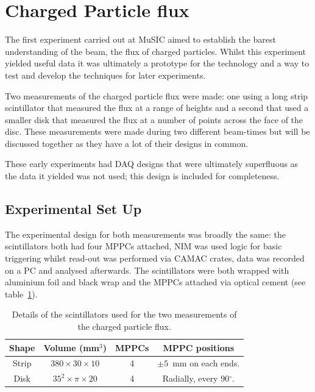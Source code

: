 \section{Charged Particle flux} %
\label{cha:charged_particle_flux}
The first experiment carried out at MuSIC aimed to establish the barest understanding of the beam, the flux of charged particles. Whilst this experiment yielded useful data it was ultimately a prototype for the technology and a way to test and develop the techniques for later experiments.

Two measurements of the charged particle flux were made: one using a long strip scintillator that measured the flux at a range of heights and a second that used a smaller disk that measured the flux at a number of points across the face of the disc. These measurements were made during two different beam-times but will be discussed together as they have a lot of their designs in common.

These early experiments had DAQ designs that were ultimately superfluous as the data it yielded was not used; this design is included for completeness.
\subsection{Experimental Set Up} %
\label{sec:experimental_set_up}
The experimental design for both measurements was broadly the same: the scintillators both had four MPPCs attached, NIM was used logic for basic triggering whilst read-out was performed via CAMAC crates, data was recorded on a PC and analysed afterwards. The scintillators were both wrapped with aluminium foil and black wrap and the MPPCs attached via optical cement (see table~\ref{tab:charged_particle_flux_scint_details}).
\begin{table}
  \begin{center}
    \begin{tabular}{c|c|c|c}
      Shape  &  Volume (mm\(^3\))            &  MPPCs  &  MPPC positions                    \\
      \hline
      Strip  &  \(380 \times30\times10\)     &  4      &  \( \pm 5 \)~mm on each ends.      \\
      Disk   &  \( 35^2\times\pi\times20\)  &  4      &  Radially, every 90\( ^{\circ} \). \\
        
    \end{tabular}
  \end{center}
  \caption{Details of the scintillators used for the two measurements of the charged particle flux.}
  \label{tab:charged_particle_flux_scint_details}
\end{table}


